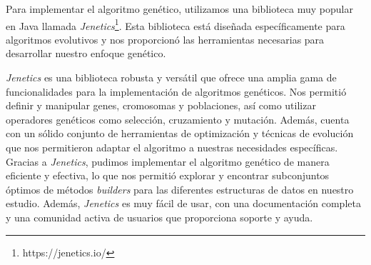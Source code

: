 
Para implementar el algoritmo genético, utilizamos una biblioteca muy popular en Java llamada \emph{Jenetics}\footnote{https://jenetics.io/}. Esta biblioteca está diseñada específicamente para algoritmos evolutivos y nos proporcionó las herramientas necesarias para desarrollar nuestro enfoque genético.

\emph{Jenetics} es una biblioteca robusta y versátil que ofrece una amplia gama de funcionalidades para la implementación de algoritmos genéticos. Nos permitió definir y manipular genes, cromosomas y poblaciones, así como utilizar operadores genéticos como selección, cruzamiento y mutación. Además, cuenta con un sólido conjunto de herramientas de optimización y técnicas de evolución que nos permitieron adaptar el algoritmo a nuestras necesidades específicas.
Gracias a \emph{Jenetics}, pudimos implementar el algoritmo genético de manera eficiente y efectiva, lo que nos permitió explorar y encontrar subconjuntos óptimos de métodos \emph{builders} para las diferentes estructuras de datos en nuestro estudio. Además, \emph{Jenetics} es muy fácil de usar, con una documentación completa y una comunidad activa de usuarios que proporciona soporte y ayuda. 








